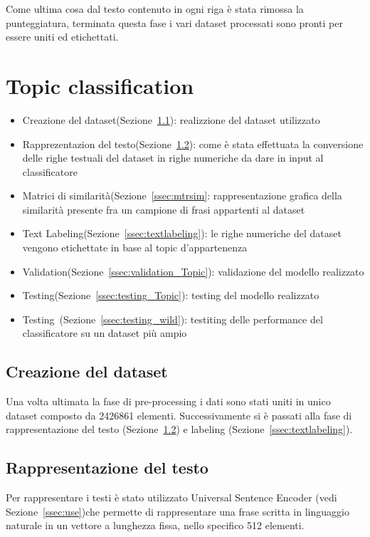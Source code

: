 Come ultima cosa dal testo contenuto in ogni riga è stata rimossa la punteggiatura, terminata questa fase i vari dataset processati sono pronti per essere uniti ed etichettati.

\section{Topic classification}
\label{sec:topicclass}

\begin{itemize}
    \item Creazione del dataset(Sezione~\ref{ssec:createds}): realizzione del dataset utilizzato
    \item Rapprezentazion del testo(Sezione~\ref{ssec:rappresentazione}): come è stata effettuata la conversione delle righe testuali del dataset in righe numeriche da dare in input al classificatore
    \item Matrici di similarità(Sezione~\ref{ssec:mtrsim}:
    rappresentazione grafica della similarità presente fra un campione di frasi appartenti al dataset
    \item Text Labeling(Sezione~\ref{ssec:textlabeling}): le righe numeriche del dataset vengono etichettate in base al topic d'appartenenza
    \item Validation(Sezione~\ref{ssec:validation_Topic}): validazione del modello realizzato
    \item Testing(Sezione~\ref{ssec:testing_Topic}): testing del modello realizzato
    \item Testing~(Sezione~\ref{ssec:testing_wild}): testiting delle performance del classificatore su un dataset più ampio
\end{itemize}


\subsection{Creazione del dataset}
\label{ssec:createds}
Una volta ultimata la fase di pre-processing i dati sono stati uniti in unico dataset composto da 2426861 elementi. Successivamente si è passati alla fase di rappresentazione del testo (Sezione~\ref{ssec:rappresentazione}) e labeling (Sezione~\ref{ssec:textlabeling}).



\subsection{Rappresentazione del testo}
\label{ssec:rappresentazione}
Per rappresentare i testi è stato utilizzato Universal Sentence Encoder (vedi Sezione~\ref{ssec:use})che permette di rappresentare una frase scritta in linguaggio naturale in un vettore a lunghezza fissa, nello specifico 512 elementi.


